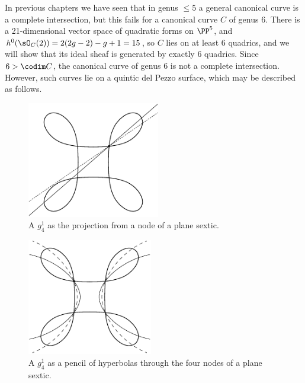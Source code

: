  In previous chapters we have seen that in genus $\leq 5$ a general canonical curve is  a complete intersection, but this fails for a canonical curve $C$ of genus 6. There is a 21-dimensional vector space of
quadratic forms on $\PP^5$, and $h^0(\sO_C(2)) = 2(2g-2)-g+1 = 15$, so $C$ lies on at least 6 quadrics, and we will show that its ideal sheaf is generated by exactly 6 quadrics. Since $6>\codim C$, the canonical curve of genus 6 is not a complete intersection. However, such curves lie on a quintic del Pezzo surface, which may be described as follows.


%
 
\begin{figure}
\centerline {\includegraphics[height=2in]{"main/Fig11-2"}}
\caption{A $g^1_4$ as the projection from a node of a plane sextic.}
\label{default}
\end{figure}

\begin{figure}
\centerline {\includegraphics[height=2in]{"main/Fig11-3"}}
\caption{A $g^1_4$ as a pencil of hyperbolas through the four nodes of a plane sextic.}
\label{default}
\end{figure}
 
